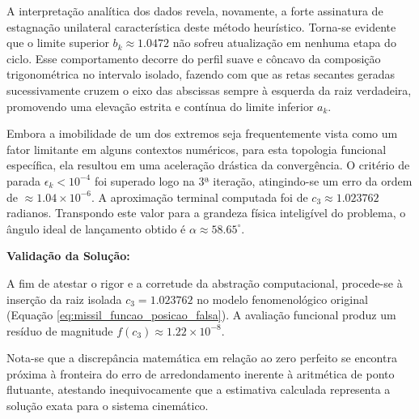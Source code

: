 A interpretação analítica dos dados revela, novamente, a forte assinatura de estagnação unilateral característica deste método heurístico. Torna-se evidente que o limite superior $b_k \approx 1.0472$ não sofreu atualização em nenhuma etapa do ciclo. Esse comportamento decorre do perfil suave e côncavo da composição trigonométrica no intervalo isolado, fazendo com que as retas secantes geradas sucessivamente cruzem o eixo das abscissas sempre à esquerda da raiz verdadeira, promovendo uma elevação estrita e contínua do limite inferior $a_k$.

Embora a imobilidade de um dos extremos seja frequentemente vista como um fator limitante em alguns contextos numéricos, para esta topologia funcional específica, ela resultou em uma aceleração drástica da convergência. O critério de parada $\epsilon_k < 10^{-4}$ foi superado logo na 3ª iteração, atingindo-se um erro da ordem de $\approx 1.04 \times 10^{-6}$. A aproximação terminal computada foi de $c_3 \approx 1.023762$ radianos. Transpondo este valor para a grandeza física inteligível do problema, o ângulo ideal de lançamento obtido é $\alpha \approx 58.65^\circ$.

\textbf{Validação da Solução:}

A fim de atestar o rigor e a corretude da abstração computacional, procede-se à inserção da raiz isolada $c_3 = 1.023762$ no modelo fenomenológico original (Equação \ref{eq:missil_funcao_posicao_falsa}). A avaliação funcional produz um resíduo de magnitude $f(c_3) \approx 1.22 \times 10^{-8}$. 

Nota-se que a discrepância matemática em relação ao zero perfeito se encontra próxima à fronteira do erro de arredondamento inerente à aritmética de ponto flutuante, atestando inequivocamente que a estimativa calculada representa a solução exata para o sistema cinemático. 

